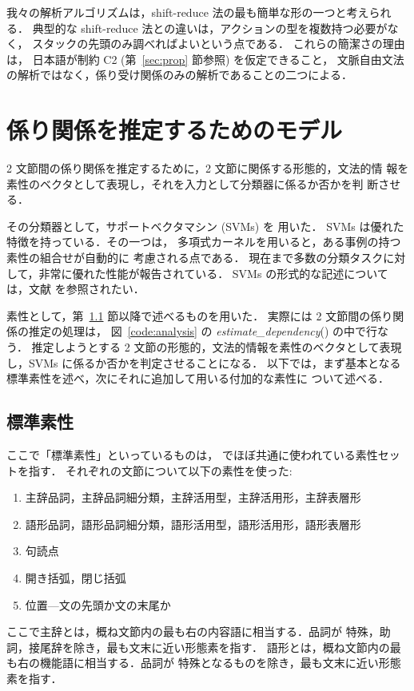 \documentclass[japanese]{jnlp_1.2c}
\begin{document}
我々の解析アルゴリズムは，shift-reduce 法の最も簡単な形の一つと考えられる．
典型的な shift-reduce 法との違いは，アクションの型を複数持つ必要がなく，
スタックの先頭のみ調べればよいという点である．
これらの簡潔さの理由は，
日本語が制約 C2 (第~\ref{sec:prop} 節参照) を仮定できること，
文脈自由文法の解析ではなく，係り受け関係のみの解析であることの二つによる．


\section{係り関係を推定するためのモデル}\label{sec:models}
2 文節間の係り関係を推定するために，2 文節に関係する形態的，文法的情
報を素性のベクタとして表現し，それを入力として分類器に係るか否かを判
断させる．

その分類器として，サポートベクタマシン (SVMs) \cite{Vapnik1995} を
用いた．
SVMs は優れた特徴を持っている．その一つは，
多項式カーネルを用いると，ある事例の持つ素性の組合せが自動的に
考慮される点である．
現在まで多数の分類タスクに対して，非常に優れた性能が報告されている．
SVMs の形式的な記述については，文献 \cite{Vapnik1995} を参照されたい．

素性として，第~\ref{subsec:stfe} 節以降で述べるものを用いた．
実際には 2 文節間の係り関係の推定の処理は，
図~\ref{code:analysis} の {\it estimate\_dependency}() の中で行なう．
推定しようとする 2 文節の形態的，文法的情報を素性のベクタとして表現
し，SVMs に係るか否かを判定させることになる．
以下では，まず基本となる標準素性を述べ，次にそれに追加して用いる付加的な素性に
ついて述べる．

\subsection{標準素性}\label{subsec:stfe}
ここで「標準素性」といっているものは，
\cite{Uchimoto1999,Sekine2000Backward,Kudo2000Japanese,Kudo2002} 
でほぼ共通に使われている素性セットを指す．
それぞれの文節について以下の素性を使った:
\begin{enumerate}
\item 主辞品詞，主辞品詞細分類，主辞活用型，主辞活用形，主辞表層形
\item 語形品詞，語形品詞細分類，語形活用型，語形活用形，語形表層形
\item 句読点
\item 開き括弧，閉じ括弧
\item 位置—文の先頭か文の末尾か
\end{enumerate}
ここで主辞とは，概ね文節内の最も右の内容語に相当する．品詞が
特殊，助詞，接尾辞を除き，最も文末に近い形態素を指す．
語形とは，概ね文節内の最も右の機能語に相当する．品詞が
特殊となるものを除き，最も文末に近い形態素を指す．
\end{document}
